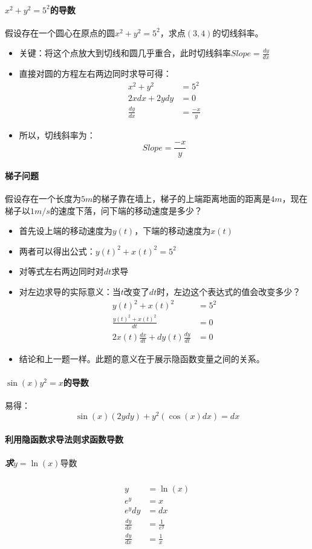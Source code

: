 \documentclass[UTF8]{ctexart}
\begin{document}
\paragraph{$x^2+y^2=5^2$的导数}
假设存在一个圆心在原点的圆$x^2+y^2=5^2$，求点$(3,4)$的切线斜率。
\begin{itemize}
	\item 关键：将这个点放大到切线和圆几乎重合，此时切线斜率$Slope = \frac{dy}{dx}$
	\item 直接对圆的方程左右两边同时求导可得：\begin{align*}
		x^2+y^2&=5^2 \\
		2xdx+2ydy&=0 \\
		\frac{dy}{dx}&=\frac{-x}{y}
	\end{align*}
	\item 所以，切线斜率为：$$Slope = \frac{-x}{y}$$
\end{itemize}
\paragraph{梯子问题}
假设存在一个长度为$5m$的梯子靠在墙上，梯子的上端距离地面的距离是$4m$，现在梯子以$1m/s$的速度下落，问下端的移动速度是多少？
\begin{itemize}
	\item 首先设上端的移动速度为$y(t)$，下端的移动速度为$x(t)$
	\item 两者可以得出公式：$y(t)^2 + x(t)^2 = 5^2$
	\item 对等式左右两边同时对$dt$求导
	\item 对左边求导的实际意义：当$t$改变了$dt$时，左边这个表达式的值会改变多少？ \begin{align*}
		y(t)^2 + x(t)^2 &= 5^2 \\
		\frac{y(t)^2 + x(t)^2}{dt} &= 0 \\
		2x(t)\frac{dx}{dt} + dy(t)\frac{dy}{dt} &= 0
	\end{align*}
	\item 结论和上一题一样。此题的意义在于展示隐函数变量之间的关系。
\end{itemize}
\paragraph{$\sin(x)y^2 = x$的导数}
易得：$$\sin(x)(2ydy)+y^2(\cos(x)dx) = dx$$
\paragraph{利用隐函数求导法则求函数导数}
\subparagraph{求$y=\ln(x)导数$}
\begin{align*}
	y &= \ln(x) \\
	e^y &= x \\
	e^ydy &= dx \\
	\frac{dy}{dx} &= \frac{1}{e^y} \\
	\frac{dy}{dx} &= \frac{1}{x}
\end{align*}
\end{document}

